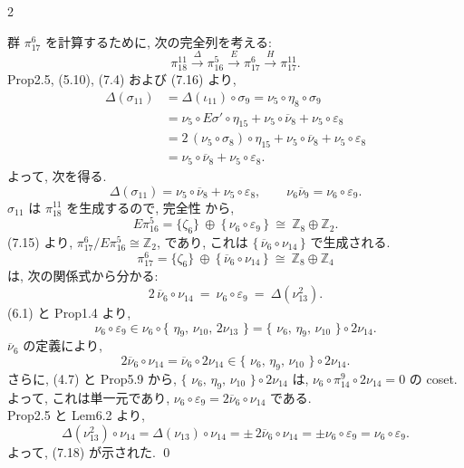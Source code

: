 \documentclass[10pt, leqno]{ltjsarticle}
\newcommand{\ov}[1]{\overline{#1}}
\newcommand{\toda}[1]{\{\,#1\,\}}              %
\newcommand{\gen}[1]{\{#1\}}       %
\newcommand{\pit}[2]{\pi_{#1}^{#2}}
\numberwithin{equation}{section}
\theoremstyle{plain}
\theoremstyle{definition}
\theoremstyle{remark}
\begin{document}
\begin{paracol}{2}

\noindent
群 \(\pit{17}{6}\) を計算するために, 次の完全列を考える:
\[
  \pit{18}{11}\xrightarrow{\ \Delta\ }\pit{16}{5}
   \xrightarrow{\ E\ }\pit{17}{6}
   \xrightarrow{\ H\ }\pit{17}{11}.
\]
Prop2.5, (5.10), (7.4) および (7.16) より,
\[
\begin{aligned}
  \Delta(\sigma_{11})
    &= \Delta(\iota_{11})\circ\sigma_{9}
    = \nu_{5}\circ\eta_{8}\circ\sigma_{9}\\
    & = \nu_{5}\circ E\sigma'\circ\eta_{15}
        + \nu_{5}\circ\overline{\nu}_{8}
        + \nu_{5}\circ\varepsilon_{8} \\
    &= 2\,(\nu_{5}\circ\sigma_{8})\circ\eta_{15}
      + \nu_{5}\circ\overline{\nu}_{8}
      + \nu_{5}\circ\varepsilon_{8}\\
    &= \nu_{5}\circ\overline{\nu}_{8}+\nu_{5}\circ\varepsilon_{8}.
\end{aligned}
\]
よって, 次を得る.
\begin{equation}
\Delta(\sigma_{11}) = \nu_5\circ\ov{\nu}_8 + \nu_5\circ\varepsilon_8,\qquad
\nu_6\ov{\nu}_9 = \nu_6\circ\varepsilon_9 .
\end{equation}
\(\sigma_{11}\) は \(\pit{18}{11}\) を生成するので, 完全性 から,
\[
  E\pit{16}{5}
  = \gen{\zeta_{6}}\ \oplus\ \gen{\,\nu_{6}\circ\varepsilon_{9}\,}
  \ \cong\ \mathbb Z_{8}\oplus\mathbb Z_{2}.
\]
(7.15) より, 
\(\pit{17}{6}/E\pit{16}{5}\cong\mathbb Z_{2}\),
であり, これは \(\gen{\,\overline{\nu}_{6}\circ \nu_{14}\,}\) で生成される. 
\[
  \pit{17}{6}
  = \gen{\zeta_{6}}\ \oplus\ \gen{\,\overline{\nu}_{6}\circ \nu_{14}\,}
  \ \cong\ \mathbb Z_{8}\oplus\mathbb Z_{4}
\]
は, 次の関係式から分かる:
\begin{equation}\label{eq:718}
2\,\overline{\nu}_{6}\circ \nu_{14}
\ =\ \nu_{6}\circ\varepsilon_{9}
\ =\ \Delta(\nu_{13}^{2}).
\end{equation}
(6.1) と Prop1.4 より,
\[
  \nu_{6}\circ\varepsilon_{9}\in
  \nu_6\circ \toda{\,\eta_{9},\,\nu_{10},\,2\nu_{13}\,}
  = \toda{\,\nu_{6},\,\eta_{9},\,\nu_{10}\,}\circ 2\nu_{14}.
\]
\(\overline{\nu}_{6}\) の定義により,
\[
  2\overline{\nu}_{6}\circ \nu_{14}
   = \overline{\nu}_{6}\circ 2\nu_{14}
   \in \toda{\,\nu_{6},\,\eta_{9},\,\nu_{10}\,}\circ 2\nu_{14} .
\]
さらに, (4.7) と Prop5.9 から, 
\(\toda{\,\nu_{6},\,\eta_{9},\,\nu_{10}\,}\circ 2\nu_{14}\)
は, \(\nu_6\circ\pit{14}{9}\circ2\nu_{14} = 0\) の coset.\\
よって, これは単一元であり, 
\(\nu_{6}\circ\varepsilon_{9} = 2\overline{\nu}_{6}\circ \nu_{14}\) である. \\
Prop2.5 と Lem6.2 より,
\[
  \Delta(\nu_{13}^{2})\circ \nu_{14}
   = \Delta(\nu_{13})\circ \nu_{14}
   = \pm\,2\overline{\nu}_{6}\circ \nu_{14}
   = \pm\nu_{6}\circ\varepsilon_{9} 
   = \nu_{6}\circ\varepsilon_{9}.
\]
よって, (7.18) が示された. 
\qed


\end{paracol}
\end{document}
